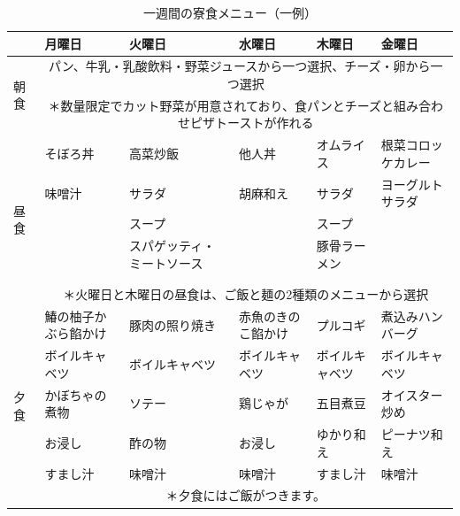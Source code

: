 \begin{table}[ht]
  {\small
  \caption*{一週間の寮食メニュー（一例）}
  \begin{tabular}{|l|p{}p{}p{}p{}p{}|}
  \hline
   & \multicolumn{1}{l|}{月曜日} & \multicolumn{1}{l|}{火曜日} & \multicolumn{1}{l|}{水曜日} & \multicolumn{1}{l|}{木曜日} & 金曜日 \\ \hline
  \multirow{2}{*}{朝食} & \multicolumn{5}{c|}{パン、牛乳・乳酸飲料・野菜ジュースから一つ選択、チーズ・卵から一つ選択} \\
   & \multicolumn{5}{c|}{＊数量限定でカット野菜が用意されており、食パンとチーズと組み合わせピザトーストが作れる} \\ \hline
  \multirow{7}{*}{昼食} & \multicolumn{1}{l|}{そぼろ丼} & \multicolumn{1}{l|}{高菜炒飯} & \multicolumn{1}{l|}{他人丼} & \multicolumn{1}{l|}{オムライス} & 根菜コロッケカレー \\
   & \multicolumn{1}{l|}{味噌汁} & \multicolumn{1}{l|}{サラダ} & \multicolumn{1}{l|}{胡麻和え} & \multicolumn{1}{l|}{サラダ} & ヨーグルトサラダ \\
   & \multicolumn{1}{l|}{} & \multicolumn{1}{l|}{スープ} & \multicolumn{1}{l|}{} & \multicolumn{1}{l|}{スープ} &  \\ \cline{2-6} 
   & \multicolumn{1}{l|}{} & \multicolumn{1}{l|}{スパゲッティ・ミートソース} & \multicolumn{1}{l|}{} & \multicolumn{1}{l|}{豚骨ラーメン} &  \\
   & \multicolumn{1}{l|}{} & \multicolumn{1}{l|}{} & \multicolumn{1}{l|}{} & \multicolumn{1}{l|}{} &  \\
   & \multicolumn{1}{l|}{} & \multicolumn{1}{l|}{} & \multicolumn{1}{l|}{} & \multicolumn{1}{l|}{} &  \\ \cline{2-6} 
   & \multicolumn{5}{c|}{＊火曜日と木曜日の昼食は、ご飯と麺の2種類のメニューから選択} \\ \hline
  \multirow{6}{*}{夕食} & \multicolumn{1}{l|}{鰆の柚子かぶら餡かけ} & \multicolumn{1}{l|}{豚肉の照り焼き} & \multicolumn{1}{l|}{赤魚のきのこ餡かけ} & \multicolumn{1}{l|}{プルコギ} & 煮込みハンバーグ \\
   & \multicolumn{1}{l|}{ボイルキャベツ} & \multicolumn{1}{l|}{ボイルキャベツ} & \multicolumn{1}{l|}{ボイルキャベツ} & \multicolumn{1}{l|}{ボイルキャベツ} & ボイルキャベツ \\
   & \multicolumn{1}{l|}{かぼちゃの煮物} & \multicolumn{1}{l|}{ソテー} & \multicolumn{1}{l|}{鶏じゃが} & \multicolumn{1}{l|}{五目煮豆} & オイスター炒め \\
   & \multicolumn{1}{l|}{お浸し} & \multicolumn{1}{l|}{酢の物} & \multicolumn{1}{l|}{お浸し} & \multicolumn{1}{l|}{ゆかり和え} & ピーナツ和え \\
   & \multicolumn{1}{l|}{すまし汁} & \multicolumn{1}{l|}{味噌汁} & \multicolumn{1}{l|}{味噌汁} & \multicolumn{1}{l|}{すまし汁} & 味噌汁 \\ \cline{2-6} 
   & \multicolumn{5}{c|}{＊夕食にはご飯がつきます。} \\ \hline
  \end{tabular}
  }
\end{table}




